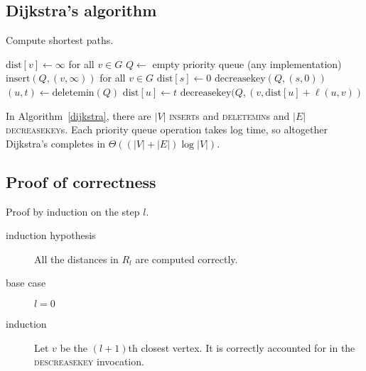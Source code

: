 \subsection{Dijkstra's algorithm}
\begin{algorithm}
	\caption{Compute shortest paths.}
	\label{dijkstra}
	\begin{algorithmic}
			\State \(\text{dist}[v] \leftarrow \infty\) for all \(v \in G\)
			\State \(Q\leftarrow\) empty priority queue (any implementation)
			\State \(\text{insert}(Q, (v, \infty))\) for all \(v \in G\)
			\State \(\text{dist}[s] \leftarrow 0\)
			\State \(\text{decreasekey}(Q, (s, 0))\)
				\State \((u, t)\leftarrow \text{deletemin}(Q)\)
				\State \(\text{dist}[u] \leftarrow t\)
						\State \(\text{decreasekey}(Q, (v, \text{dist}[u] + \ell(u, v))\)
					\EndIf
				\EndFor
			\EndWhile
		\EndFunction
	\end{algorithmic}
\end{algorithm}

In Algorithm~\ref{dijkstra}, there are \(\left|V\right|\) \textsc{insert}s and \textsc{deletemin}s and \(\left|E\right|\) \textsc{decreasekey}s.
Each priority queue operation takes log time, so altogether Dijkstra's
completes in \(\Theta\left(\left(\left|V\right| + \left|E\right|\right)\log \left|V\right|\right)\).

\subsection{Proof of correctness}

Proof by induction on the step \(l\).
\begin{description}
	\item[induction hypothesis] All the distances in \(R_l\) are computed correctly.
	\item[base case] \(l = 0\)
	\item[induction] Let \(v\) be the \((l + 1)\)th closest vertex. It is correctly accounted for in the \textsc{descreasekey} invocation.
\end{description}
